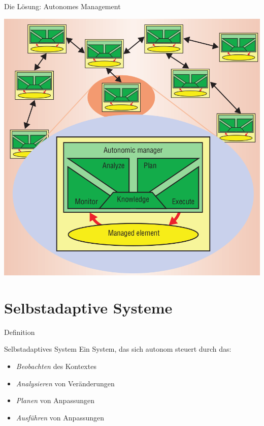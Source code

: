 \documentclass[de,16:9]{sdqbeamer}
\begin{document}
\begin{frame}{Die Lösung: Autonomes Management}
	\begin{center}
		\includegraphics[height=0.7\textheight]{sources/MAPEK.png}
		\cite{VisionOfAutonomicComputing}
	\end{center}
\end{frame}

\section{Selbstadaptive Systeme}

\begin{frame}{Definition}
	\begin{greenblock}{Selbstadaptives System}
		Ein System, das sich autonom steuert durch das:
		\begin{itemize}
			\item \textit{Beobachten} des Kontextes
			\item \textit{Analysieren} von Veränderungen
			\item \textit{Planen} von Anpassungen
			\item \textit{Ausführen} von Anpassungen
		\end{itemize}
	\end{greenblock}
\end{frame}
\end{document}
